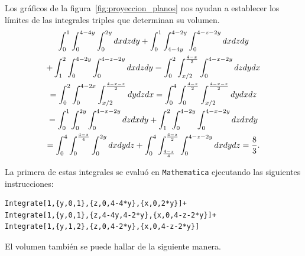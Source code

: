 Los gráficos de la figura~\ref{fig:proyeccion_planos} nos ayudan a establecer los límites de las integrales triples que determinan su volumen.
\begin{multline*}
  \displaystyle \int_{0}^{1}\int_{0}^{4-4y}\int_{0}^{2y}dxdzdy +\int_{0}^{1}\int_{4-4y}^{4-2y}\int_{0}^{4-z-2y} dxdzdy\\
  + \int_{1}^{2}\int_{0}^{4-2y}\int_{0}^{4-z-2y}dxdzdy=
  \displaystyle \int_{0}^{2}\int_{x/2}^{\frac{4-x}{2}}\int_{0}^{4-x-2y}dzdydx\\
  = \displaystyle \int_{0}^{2}\int_{0}^{4-2x}\int_{x/2}^{\frac{4-x-z}{2}}dydzdx= \int_{0}^{4}\int_{0}^{\frac{4-z}{2}}\int_{x/2}^{\frac{4-x-z}{2}}dydxdz\\
  = \displaystyle \int_{0}^{1}\int_{0}^{2y}\int_{0}^{4-x-2y}dzdxdy+\int_{1}^{2}\int_{0}^{4-2y}\int_{0}^{4-x-2y}dzdxdy \\
  = \displaystyle \int_{0}^{4}\int_{0}^{\frac{4-z}{4}}\int_{0}^{2y}dxdydz+\int_{0}^{4}\int_{\frac{4-z}{4}}^{\frac{4-z}{2}}\int_{0}^{4-z-2y}dxdydz =\frac{8}{3}.
\end{multline*}

La primera de estas integrales se evaluó en \verb"Mathematica" ejecutando las siguientes instrucciones:
\enlargethispage{\baselineskip}

\begin{tcolorbox}[title=\bf Instrucción en \verb"Mathematica"]\begin{Verbatim}[formatcom=\letraverbatim]
Integrate[1,{y,0,1},{z,0,4-4*y},{x,0,2*y}]+
Integrate[1,{y,0,1},{z,4-4y,4-2*y},{x,0,4-z-2*y}]+
Integrate[1,{y,1,2},{z,0,4-2*y},{x,0,4-z-2*y}]
\end{Verbatim}
\end{tcolorbox}

%
\pagebreak[0]
El volumen también se puede hallar de la siguiente manera.

